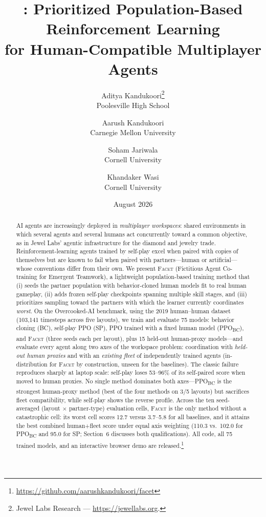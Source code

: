 \documentclass[11pt]{article}
\title{\textbf{\facet{}: Prioritized Population-Based Reinforcement Learning\\
for Human-Compatible Multiplayer Agents}}
\author{%
  Aditya Kandukoori\thanks{Jewel Labs Research --- \url{https://jewellabs.org}.} \\
  Poolesville High School
  \and
  Aarush Kandukoori\footnotemark[1] \\
  Carnegie Mellon University
  \and
  Soham Jariwala\footnotemark[1] \\
  Cornell University
  \and
  Khandaker Wasi\footnotemark[1] \\
  Cornell University
}
\date{August 2026}
\newcommand{\facet}{\textsc{Facet}}
\newcommand{\ppobc}{PPO\textsubscript{BC}}
\begin{document}
\maketitle

\begin{abstract}
AI agents are increasingly deployed in \emph{multiplayer workspaces}: shared
environments in which several agents and several humans act concurrently
toward a common objective, as in Jewel Labs' agentic infrastructure for the
diamond and jewelry trade. Reinforcement-learning agents trained by self-play
excel when paired with copies of themselves but are known to fail when paired
with partners---human or artificial---whose conventions differ from their own.
We present \facet{} (Fictitious Agent Co-training for Emergent Teamwork), a
lightweight population-based training method that (i) seeds the partner
population with behavior-cloned human models fit to real human gameplay,
(ii) adds frozen self-play checkpoints spanning multiple skill stages, and
(iii) prioritizes sampling toward the partners with which the learner
currently coordinates \emph{worst}. On the Overcooked-AI benchmark, using the
2019 human--human dataset (103{,}141 timesteps across five layouts), we train
and evaluate 75 models: behavior cloning (BC), self-play PPO (SP), PPO
trained with a fixed human model (\ppobc{}), and \facet{} (three seeds
each per layout), plus 15 held-out human-proxy models---and evaluate every
agent along two axes of the workspace problem: coordination with
\emph{held-out human proxies} and with an \emph{existing fleet} of
independently trained agents (in-distribution for \facet{} by
construction, unseen for the baselines). The classic failure reproduces
sharply at laptop scale: self-play loses 53--96\% of its self-paired score
when moved to human proxies. No single method dominates both
axes---\ppobc{} is the strongest human-proxy method (best of the four
methods on 3/5 layouts) but sacrifices fleet compatibility, while
self-play shows the reverse profile. Across the ten seed-averaged
(layout $\times$ partner-type) evaluation cells, \facet{} is the only
method without a catastrophic cell: its worst cell scores 12.7 versus
3.7--5.8 for all baselines, and it attains the best combined human+fleet
score under equal axis weighting (110.3 vs.\ 102.0 for \ppobc{} and 95.0
for SP; Section~6 discusses both qualifications). All code, all 75
trained models, and an interactive browser demo are
released.\footnote{\url{https://github.com/aarushkandukoori/facet}}
\end{abstract}
\end{document}
